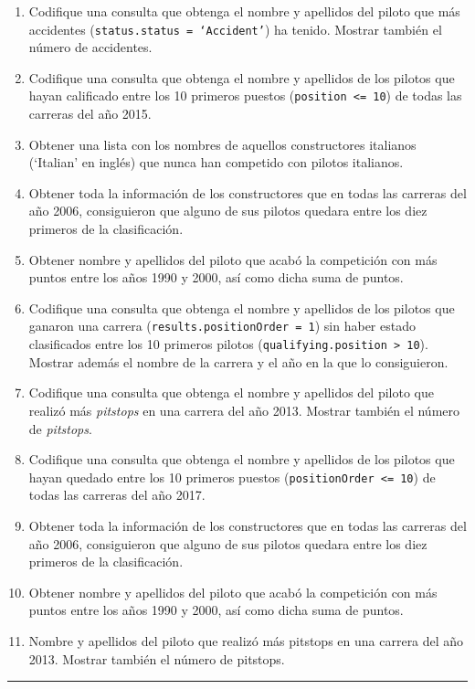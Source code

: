 \documentclass[a4paper]{article}
\begin{document}
\begin{enumerate}
    \item Codifique una consulta que obtenga el nombre y apellidos del piloto que más accidentes (\texttt{status.status = `Accident'}) ha tenido. Mostrar también el número de accidentes.
            
    \item Codifique una consulta que obtenga el nombre y apellidos de los pilotos que hayan calificado entre los 10 primeros puestos (\texttt{position <= 10}) de todas las carreras del año 2015.
    
    \item Obtener una lista con los nombres de aquellos constructores italianos (‘Italian’ en inglés) que nunca han competido con pilotos italianos.
    
    \item Obtener toda la información de los constructores que en todas las carreras del año 2006, consiguieron que alguno de sus pilotos quedara entre los diez primeros de la clasificación.
    
    \item Obtener nombre y apellidos del piloto que acabó la competición con más puntos entre los años 1990 y 2000, así como dicha suma de puntos.

    \item Codifique una consulta que obtenga el nombre y apellidos de los pilotos que ganaron una carrera (\texttt{results.positionOrder = 1}) sin haber estado clasificados entre los 10 primeros pilotos (\texttt{qualifying.position > 10}). Mostrar además el nombre de la carrera y el año en la que lo consiguieron.

    \item Codifique una consulta que obtenga el nombre y apellidos del piloto que realizó más \emph{pitstops} en una carrera del año 2013. Mostrar también el número de \emph{pitstops}.
    
    \item Codifique una consulta que obtenga el nombre y apellidos de los pilotos que hayan quedado entre los 10 primeros puestos (\texttt{positionOrder <= 10}) de todas las carreras del año 2017.
            
    \item Obtener toda la información de los constructores que en todas las carreras del año 2006, consiguieron que alguno de sus pilotos quedara entre los diez primeros de la clasificación.
    
    \item Obtener nombre y apellidos del piloto que acabó la competición con más puntos entre los años 1990 y 2000, así como dicha suma de puntos.
    
    \item Nombre y apellidos del piloto que realizó más pitstops en una carrera del año 2013. Mostrar también el número de pitstops.
\end{enumerate}

\vspace{2em}
\hrule
\doclicenseThis
\end{document}
